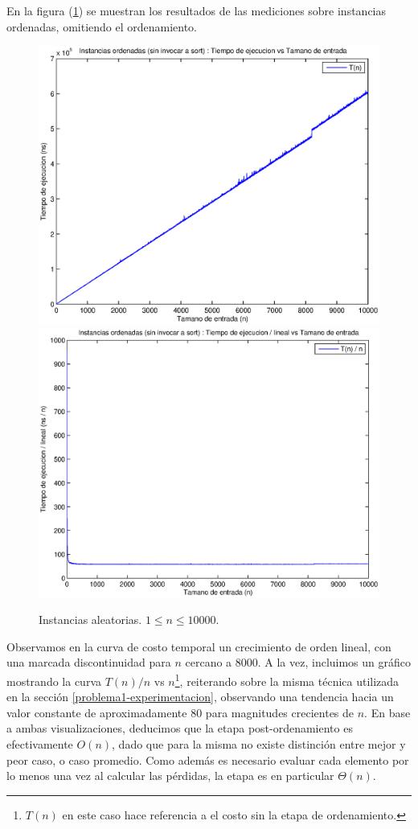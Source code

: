En la figura (\ref{fig:problema2-ciclo}) se muestran los resultados de las mediciones sobre instancias ordenadas, omitiendo el ordenamiento.

\begin{center}
  \begin{figure}[H]
    \includegraphics[width=0.5\linewidth]{problema2/graficos/problema2_ordenada_10000.eps}
    \includegraphics[width=0.5\linewidth]{problema2/graficos/problema2_ordenada_10000_div_n.eps}
  \caption{Instancias aleatorias. $1 \leq n \leq 10000$.}
  \label{fig:problema2-ciclo}
  \end{figure}
\end{center}

Observamos en la curva de costo temporal un crecimiento de orden lineal, con una marcada discontinuidad para $n$ cercano a $8000$. A la vez, incluimos un gráfico mostrando la curva $T(n) / n$ vs $n$\footnote{$T(n)$ en este caso hace referencia a el costo sin la etapa de ordenamiento.}, reiterando sobre la misma técnica utilizada en la sección \ref{problema1-experimentacion}, observando una tendencia hacia un valor constante de aproximadamente $80$ para magnitudes crecientes de $n$. En base a ambas visualizaciones, deducimos que la etapa post-ordenamiento es efectivamente $O(n)$, dado que para la misma no existe distinción entre mejor y peor caso, o caso promedio. Como además es necesario evaluar cada elemento por lo menos una vez al calcular las pérdidas, la etapa es en particular $\Theta(n)$.

